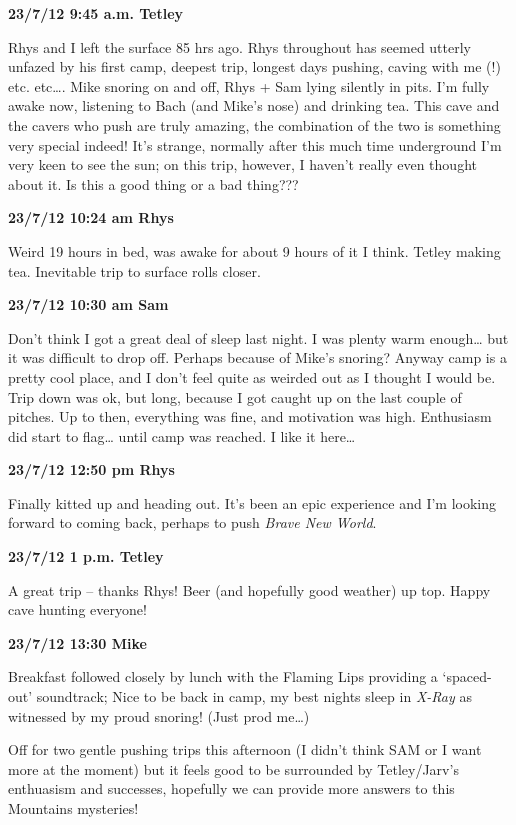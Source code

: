 \textbf{23/7/12 9:45 a.m. Tetley}

Rhys and I left the surface 85 hrs ago. Rhys throughout has seemed
utterly unfazed by his first camp, deepest trip, longest days pushing,
caving with me (!) etc. etc\ldots{}. Mike snoring on and off, Rhys + Sam
lying silently in pits. I'm fully awake now, listening to Bach (and
Mike's nose) and drinking tea. This cave and the cavers who push are
truly amazing, the combination of the two is something very special
indeed! It's strange, normally after this much time underground I'm very
keen to see the sun; on this trip, however, I haven't really even
thought about it. Is this a good thing or a bad thing???

\textbf{23/7/12 10:24 am Rhys}

Weird 19 hours in bed, was awake for about 9 hours of it I think. Tetley
making tea. Inevitable trip to surface rolls closer.

\textbf{23/7/12 10:30 am Sam}

Don't think I got a great deal of sleep last night. I was plenty warm
enough\ldots{} but it was difficult to drop off. Perhaps because of
Mike's snoring? Anyway camp is a pretty cool place, and I don't feel
quite as weirded out as I thought I would be. Trip down was ok, but
long, because I got caught up on the last couple of pitches. Up to then,
everything was fine, and motivation was high. Enthusiasm did start to
flag\ldots{} until camp was reached. I like it here\ldots{}

\textbf{23/7/12 12:50 pm Rhys}

Finally kitted up and heading out. It's been an epic experience and I'm
looking forward to coming back, perhaps to push \emph{Brave New World}.

\textbf{23/7/12 1 p.m. Tetley}

A great trip -- thanks Rhys! Beer (and hopefully good weather) up top.
Happy cave hunting everyone!

\textbf{23/7/12 13:30 Mike}

Breakfast followed closely by lunch with the Flaming Lips providing a
`spaced-out' soundtrack; Nice to be back in camp, my best nights sleep
in \emph{X-Ray} as witnessed by my proud snoring! (Just prod me\ldots{})

Off for two gentle pushing trips this afternoon (I didn't think SAM or I
want more at the moment) but it feels good to be surrounded by
Tetley/Jarv's enthuasism and successes, hopefully we can provide more
answers to this Mountains mysteries!

